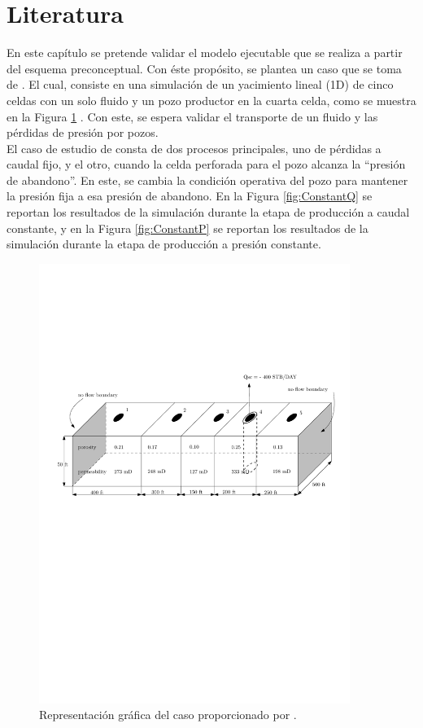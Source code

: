 \section{Literatura}
En este capítulo se pretende validar el modelo ejecutable que se realiza a partir del esquema preconceptual. Con éste propósito, se plantea un caso que se toma de \cite{jamal2006petroleum}. El cual, consiste en una simulación de un yacimiento lineal (1D) de cinco celdas con un solo fluido y un pozo productor en la cuarta celda, como se muestra en la Figura \ref{fig:Abou-Kassem} \citep{jamal2006petroleum}. Con este, se espera validar el transporte de un fluido y las pérdidas de presión por pozos.\\

El caso de estudio de \cite{jamal2006petroleum} consta de dos procesos principales, uno de pérdidas a caudal fijo, y el otro, cuando la celda perforada para el pozo alcanza la ``presión de abandono''. En este, se cambia la condición operativa del pozo para mantener la presión fija a esa presión de abandono. En la Figura \ref{fig:ConstantQ} se reportan los resultados de la simulación durante la etapa de producción a caudal constante, y en la Figura \ref{fig:ConstantP} se reportan los resultados de la simulación durante la etapa de producción a presión constante.
\begin{figure}[h]
	\centering
	\includegraphics[width=0.9\textwidth]{Fig/casoasis.pdf}
	\caption{Representación gráfica del caso proporcionado por \cite{jamal2006petroleum}.}
	\label{fig:Abou-Kassem}
\end{figure}



